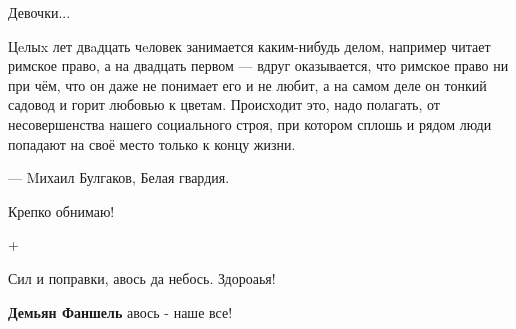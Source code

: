 \begin{itemize}
\begin{itemize}
Девочки...

 

Цeлыx лет двaдцать чeловек занимается каким-нибудь делом, например читает
римское право, а на двадцать первом — вдруг оказывается, что римское право ни
при чём, что он даже не понимает его и не любит, а на самом деле он тонкий
садовод и горит любовью к цветам. Происходит это, надо полагать, от
несовершенства нашего социального строя, при котором сплошь и рядом люди
попадают на своё место только к концу жизни.

— Mихаил Булгаков, Белая гвардия.

\end{itemize}

 
Крепко обнимаю!

 
+

 
Сил и поправки, авось да небось. Здороаья!

\begin{itemize}
 
\textbf{Демьян Фаншель} авось - наше все!
\end{itemize}

 


\end{itemize}
